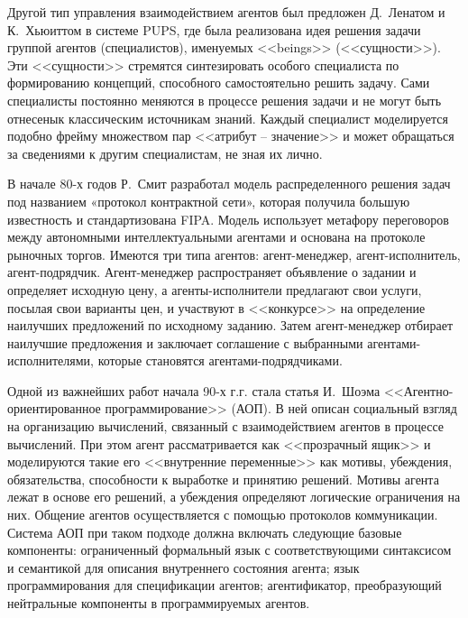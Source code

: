 Другой тип управления взаимодействием агентов был предложен Д.~Ленатом и К.~Хьюиттом в системе PUPS, где была реализована идея решения задачи группой агентов (специалистов), именуемых <<beings>> (<<сущности>>). Эти <<сущности>> стремятся синтезировать особого специалиста по формированию концепций, способного самостоятельно решить задачу. Сами специалисты постоянно меняются в процессе решения задачи и не могут быть отнесенык классическим источникам знаний. Каждый специалист моделируется подобно фрейму множеством пар <<атрибут -- значение>> и может обращаться за сведениями к другим специалистам, не зная их лично.

В начале 80-х годов Р.~Смит разработал модель распределенного решения задач под названием «протокол контрактной сети», которая получила большую известность и стандартизована FIPA. Модель использует метафору переговоров между автономными интеллектуальными агентами и основана на протоколе рыночных торгов. Имеются три типа агентов: агент-менеджер, агент-исполнитель, агент-подрядчик. Агент-менеджер распространяет объявление о задании и определяет исходную цену, а агенты-исполнители предлагают свои услуги, посылая свои варианты цен, и участвуют в <<конкурсе>> на определение наилучших предложений по исходному заданию. Затем агент-менеджер отбирает наилучшие предложения и заключает соглашение с выбранными агентами-исполнителями, которые становятся агентами-подрядчиками.

Одной из важнейших работ начала 90-х г.г. стала статья И.~Шоэма <<Агентно-ориентированное программирование>> (АОП). В ней описан социальный взгляд на организацию вычислений, связанный с взаимодействием агентов в процессе вычислений. При этом агент рассматривается как <<прозрачный ящик>> и моделируются такие его <<внутренние переменные>> как мотивы, убеждения, обязательства, способности к выработке и принятию решений. Мотивы агента лежат в основе его решений, а убеждения определяют логические ограничения на них. Общение агентов осуществляется с помощью протоколов коммуникации.
Система АОП при таком подходе должна включать следующие базовые компоненты: ограниченный формальный язык с соответствующими синтаксисом и семантикой для описания внутреннего состояния агента; язык программирования для спецификации агентов; агентификатор, преобразующий нейтральные компоненты в программируемых агентов.

